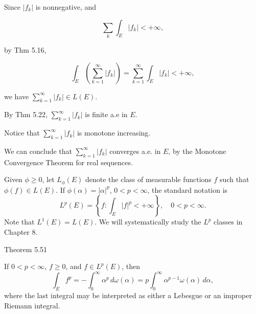 \documentclass[UTF8,a4paper,10pt]{article}
\begin{document}
Since 
\(|f_k|\) is nonnegative, and

\[\sum_{k} \int_E |f_k| < +\infty,\]

by Thm 5.16,

\[
  \int_E \left(\sum_{k=1}^{\infty} |f_k| \right) = \sum_{k=1}^{\infty} \int_E |f_k| <  +\infty,
\]

we have \(  \sum_{k=1}^{\infty} |f_k| \in L(E)\).


By Thm 5.22, \( \sum_{k=1}^{\infty} |f_k| \) is finite a.e in \(E\). 

Notice that \( \sum_{k=1}^{\infty} |f_k|\) is monotone increasing. 

We can conclude that \( \sum_{k=1}^{\infty} |f_k|\) converges a.e. in \(E\), by the Monotone Convergence Theorem for real sequences.






\pagebreak


\begin{mybox}{}
Given $\phi \geq 0$, let $L_{\phi}(E)$ denote the class of measurable functions $f$ such that $\phi(f) \in L(E)$. If $\phi(\alpha) = |\alpha|^p$, $0 < p < \infty$, the standard notation is
\[
L^p(E) = \left\{ f : \int_{E} |f|^p < +\infty \right\}, \quad 0 < p < \infty.
\]
Note that $L^1(E) = L(E)$. We will systematically study the $L^p$ classes in Chapter 8.

\end{mybox}


\begin{mybox}{Theorem 5.51}
  
If $0 < p < \infty$, $f \geq 0$, and $f \in L^p(E)$, then
\[
\int_{E} f^p = -\int_{0}^{\infty} \alpha^p \, d\omega(\alpha) = p \int_{0}^{\infty} \alpha^{p-1} \omega(\alpha) \, d\alpha,
\]
where the last integral may be interpreted as either a Lebesgue or an improper Riemann integral.

\end{mybox}


  
\end{document}
